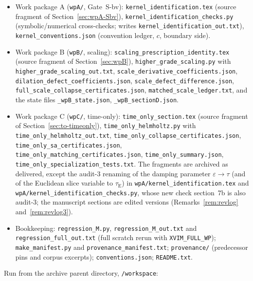 \documentclass{article}
\theoremstyle{remark}
\begin{document}
\begin{sloppypar}
\begin{itemize}
\item Work package A (\texttt{wpA/}, Gate~S-bv): \texttt{kernel\_identification.tex} (source fragment of Section~\ref{sec:wpA-Sbv}), \texttt{kernel\_identification\_checks.py} (symbolic/numerical cross-checks; writes \texttt{kernel\_identification\_out.txt}), \texttt{kernel\_conventions.json} (convention ledger, $c$, boundary side).
\item Work package B (\texttt{wpB/}, scaling): \texttt{scaling\_prescription\_identity.tex} (source fragment of Section~\ref{sec:wpB}), \texttt{higher\_grade\_scaling.py} with \texttt{higher\_grade\_scaling\_out.txt}, \texttt{scale\_derivative\_coefficients.json}, \texttt{dilation\_defect\_coefficients.json}, \texttt{scale\_defect\_difference.json}, \texttt{full\_scale\_collapse\_certificates.json}, \texttt{matched\_scale\_ledger.txt}, and the state files \texttt{\_wpB\_state.json}, \texttt{\_wpB\_sectionD.json}.
\item Work package C (\texttt{wpC/}, time-only): \texttt{time\_only\_section.tex} (source fragment of Section~\ref{sec:to-timeonly}), \texttt{time\_only\_helmholtz.py} with \texttt{time\_only\_helmholtz\_out.txt}, \texttt{time\_only\_collapse\_certificates.json}, \texttt{time\_only\_sa\_certificates.json}, \texttt{time\_only\_matching\_certificates.json}, \texttt{time\_only\_summary.json}, \texttt{time\_only\_specialization\_tests.txt}.
The fragments are archived as delivered, except the audit-3 renaming of the damping parameter $\varepsilon\to\tau$ (and of the Euclidean slice variable to $\tau_{\mathrm E}$) in \texttt{wpA/kernel\_identification.tex} and \texttt{wpA/kernel\_identification\_checks.py}, whose new check section~7b is also audit-3; the manuscript sections are edited versions (Remarks~\ref{rem:revlog} and~\ref{rem:revlog3}).
\item Bookkeeping: \texttt{regression\_M.py}, \texttt{regression\_M\_out.txt} and \texttt{regression\_full\_\allowbreak out.txt} (full scratch rerun with \texttt{XVIM\_FULL\_WP}); \texttt{make\_manifest.py} and \texttt{provenance\_manifest.txt}; \texttt{provenance/} (predecessor pins and corpus excerpts); \texttt{conventions.json}; \texttt{README.txt}.
\end{itemize}
\end{sloppypar}
Run from the archive parent directory, \texttt{/workspace}:
\end{document}
